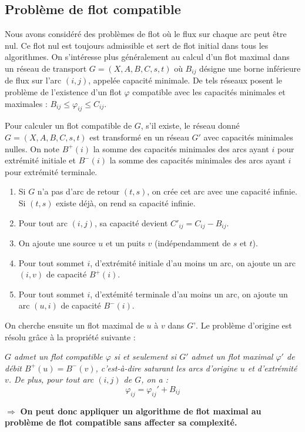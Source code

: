 \documentclass{article}
\begin{document}
\subsection{Problème de flot compatible}

Nous avons considéré des problèmes de flot où le flux sur chaque arc peut être nul. Ce flot nul est toujours admissible et sert de flot initial dans tous les algorithmes. On s’intéresse 
plus généralement au calcul d’un flot maximal dans un réseau de transport $G=(X,A,B,C,s,t)$ où $B_{ij}$ désigne une borne inférieure de flux sur l’arc $(i,j)$, appelée capacité 
minimale. De tels réseaux posent le problème de l’existence d’un flot $\varphi$ compatible avec les capacités minimales et maximales : $B_{ij} \leq \varphi_{ij} \leq C_{ij}$.

Pour calculer un flot compatible de $G$, s’il existe, le réseau donné $G=(X,A,B,C,s,t)$ est transformé en un réseau $G'$ avec capacités minimales nulles. On note $B^+(i)$ la 
somme des capacités minimales des arcs ayant $i$ pour extrémité initiale et $B^-(i)$ la somme des capacités minimales des arcs ayant $i$ pour extrémité terminale.
\begin{enumerate}
\item Si $G$ n’a pas d’arc de retour $(t,s)$, on crée cet arc avec une capacité infinie. \\Si $(t,s)$ existe déjà, on rend sa capacité infinie.
\item Pour tout arc $(i,j)$, sa capacité devient $C'_{ij} =C_{ij} -B_{ij}$.
\item On ajoute une source $u$ et un puits $v$ (indépendamment de $s$ et $t$).
\item Pour tout sommet $i$, d’extrémité initiale d’au moins un arc, on ajoute un arc $(i,v)$ de capacité $B^+(i)$.
\item Pour tout sommet $i$, d’extémité terminale d’au moins un arc, on ajoute un arc $(u,i)$ de capacité $B^-(i)$.
\end{enumerate}
\newpage
\noindent On cherche ensuite un flot maximal de $u$ à $v$ dans $G’$. Le problème d’origine est résolu grâce à la propriété suivante : \begin{center}
\textit{$G$ admet un flot compatible $\varphi$ si et seulement si $G'$ admet un flot maximal $\varphi '$ de débit $B^+(u) = B^-(v)$, c’est-à-dire saturant les arcs d’origine $u$ 
et d’extrémité $v$. De plus, pour tout arc $(i,j)$ de $G$, on a : } $$\varphi_{ij} = \varphi_{ij}'+B_{ij}$$\end{center}
$\Rightarrow$ \textbf{On peut donc appliquer un algorithme de flot maximal au problème de flot compatible sans affecter sa complexité.} \\
\end{document}
